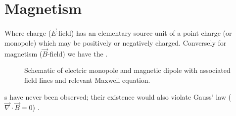 \section{Magnetism}
Where charge ($\vec{E}$-field) has an elementary source unit of a point charge (or monopole) which may be positively or negatively charged. Conversely for magnetism ($\vec{B}$-field) we have the . 


\begin{figure}[H]
    \begin{center}
        
        \hspace{2cm}
        

    \end{center}
    \caption{Schematic of electric monopole and magnetic dipole with associated field lines and relevant Maxwell equation.}\label{fig:}
\end{figure}

s have never been observed; their existence would also violate Gauss' law ($\vec{\nabla} \cdot \vec{B} = 0 $) \cite{Jackson1998-er}. 





